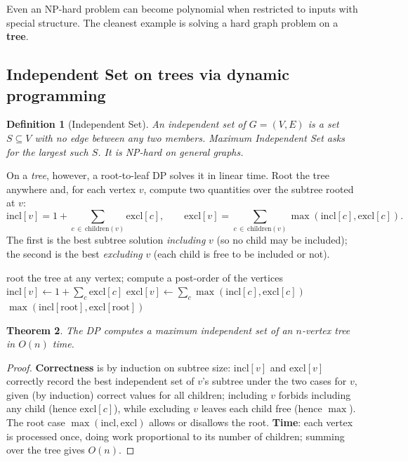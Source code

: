 \documentclass[11pt]{article}
\newtheorem{theorem}{Theorem}[section]
\newtheorem{definition}[theorem]{Definition}
\begin{document}
Even an NP-hard problem can become polynomial when restricted to inputs with
special structure. The cleanest example is solving a hard graph problem on a
\textbf{tree}.

\subsection{Independent Set on trees via dynamic programming}

\begin{definition}[Independent Set]
An \emph{independent set} of $G=(V,E)$ is a set $S \subseteq V$ with no edge
between any two members. Maximum Independent Set asks for the largest such $S$.
It is NP-hard on general graphs.
\end{definition}

On a \emph{tree}, however, a root-to-leaf DP solves it in linear time. Root the
tree anywhere and, for each vertex $v$, compute two quantities over the subtree
rooted at $v$:
\[
\mathrm{incl}[v] = 1 + \!\!\sum_{c \,\in\, \mathrm{children}(v)}\!\! \mathrm{excl}[c],
\qquad
\mathrm{excl}[v] = \!\!\sum_{c \,\in\, \mathrm{children}(v)}\!\! \max(\mathrm{incl}[c], \mathrm{excl}[c]).
\]
The first is the best subtree solution \emph{including} $v$ (so no child may be
included); the second is the best \emph{excluding} $v$ (each child is free to be
included or not).

\begin{algorithm}[h]
\caption{Maximum Independent Set on a Tree}
\begin{algorithmic}[1]
\State root the tree at any vertex; compute a post-order of the vertices
    \State $\mathrm{incl}[v] \gets 1 + \sum_{c} \mathrm{excl}[c]$
    \State $\mathrm{excl}[v] \gets \sum_{c} \max(\mathrm{incl}[c], \mathrm{excl}[c])$
\EndFor
\State \Return $\max(\mathrm{incl}[\text{root}], \mathrm{excl}[\text{root}])$
\end{algorithmic}
\end{algorithm}

\begin{theorem}
The DP computes a maximum independent set of an $n$-vertex tree in $O(n)$ time.
\end{theorem}

\begin{proof}
\textbf{Correctness} is by induction on subtree size: $\mathrm{incl}[v]$ and
$\mathrm{excl}[v]$ correctly record the best independent set of $v$'s subtree
under the two cases for $v$, given (by induction) correct values for all
children; including $v$ forbids including any child (hence $\mathrm{excl}[c]$),
while excluding $v$ leaves each child free (hence $\max$). The root case
$\max(\mathrm{incl},\mathrm{excl})$ allows or disallows the root.
\textbf{Time}: each vertex is processed once, doing work proportional to its
number of children; summing over the tree gives $O(n)$.
\end{proof}
\end{document}
